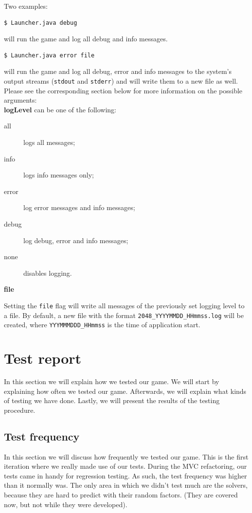 \documentclass[a4paper,11pt,report]{scrartcl}
\begin{document}
Two examples:
\begin{verbatim}
$ Launcher.java debug
\end{verbatim}
will run the game and log all debug and info messages. 
\begin{verbatim}
$ Launcher.java error file
\end{verbatim}
will run the game and log all debug, error and info messages to the system's
output streams (\texttt{stdout} and \texttt{stderr}) and will write them to a
new file as well.\\

Please see the corresponding section below for more information on the possible
arguments:\\

\textbf{logLevel} can be one of the following:
\begin{description}
	\item[all] logs all messages;
	\item[info] logs info messages only;
	\item[error] log error messages and info messages;
	\item[debug] log debug, error and info messages;
	\item[none] disables logging.
\end{description}

\textbf{file}

Setting the \texttt{file} flag will write all messages of the previously set
logging level to a file. By default, a new file with the format
\texttt{2048\_YYYYMMDD\_HHmmss.log} will be created, where
\texttt{YYYMMMDDD\_HHmmss} is the time of application start.

\newpage\section{Test report}

In this section we will explain how we tested our game. We will start by
explaining how often we tested our game. Afterwards, we will explain what
kinds of testing we have done. Lastly, we will present the results of the
testing procedure.

\subsection{Test frequency}
In this section we will discuss how frequently we tested our game. This is the
first iteration where we really made use of our tests. During the MVC
refactoring, our tests came in handy for regression testing. As such, the test
frequency was higher than it normally was. The only area in which we didn't test
much are the solvers, because they are hard to predict with their random
factors. (They are covered now, but not while they were developed).
\end{document}
